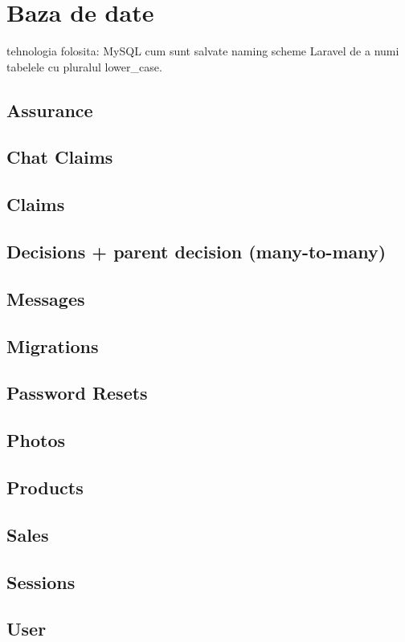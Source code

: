 \section{Baza de date}
	tehnologia folosita: MySQL
	cum sunt salvate
	naming scheme Laravel de a numi tabelele cu pluralul lower\_case.
	\subsection{Assurance}
	\subsection{Chat Claims}
	\subsection{Claims}
	\subsection{Decisions + parent decision (many-to-many)}
	\subsection{Messages}
	\subsection{Migrations}
	\subsection{Password Resets}
	\subsection{Photos}
	\subsection{Products}
	\subsection{Sales}
	\subsection{Sessions}
	\subsection{User}